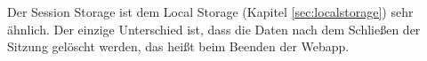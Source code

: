 
Der Session Storage ist dem Local Storage (Kapitel \ref{sec:localstorage}) sehr ähnlich. 
Der einzige Unterschied ist, dass die Daten nach dem Schließen der Sitzung gelöscht werden, das heißt beim Beenden der Webapp.

